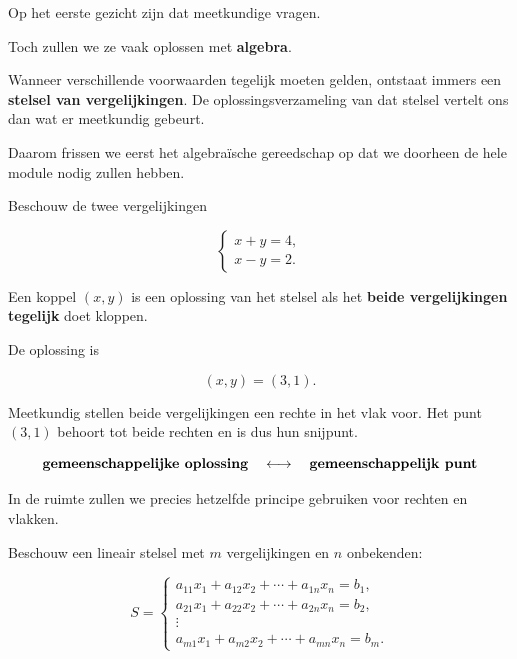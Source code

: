 \documentclass{ximera}
\begin{document}
Op het eerste gezicht zijn dat meetkundige vragen.

Toch zullen we ze vaak oplossen met \textbf{algebra}.

Wanneer verschillende voorwaarden tegelijk moeten gelden, ontstaat immers
een \textbf{stelsel van vergelijkingen}. De oplossingsverzameling van dat
stelsel vertelt ons dan wat er meetkundig gebeurt.

Daarom frissen we eerst het algebraïsche gereedschap op dat we doorheen
de hele module nodig zullen hebben.


\begin{voorbeeld}

Beschouw de twee vergelijkingen

\[
\begin{cases}
x+y=4,\\
x-y=2.
\end{cases}
\]

Een koppel \((x,y)\) is een oplossing van het stelsel als het
\textbf{beide vergelijkingen tegelijk} doet kloppen.

De oplossing is

\[
(x,y)=(3,1).
\]

Meetkundig stellen beide vergelijkingen een rechte in het vlak voor.
Het punt \((3,1)\) behoort tot beide rechten en is dus hun snijpunt.

\[
\text{\textbf{gemeenschappelijke oplossing}}
\quad\longleftrightarrow\quad
\text{\textbf{gemeenschappelijk punt}}
\]

In de ruimte zullen we precies hetzelfde principe gebruiken voor
rechten en vlakken.
\end{voorbeeld}





Beschouw een lineair stelsel met \(m\) vergelijkingen en \(n\) onbekenden:

\[
S=
\begin{cases}
a_{11}x_1+a_{12}x_2+\cdots+a_{1n}x_n=b_1,\\
a_{21}x_1+a_{22}x_2+\cdots+a_{2n}x_n=b_2,\\
\vdots\\
a_{m1}x_1+a_{m2}x_2+\cdots+a_{mn}x_n=b_m.
\end{cases}
\]
\end{document}
